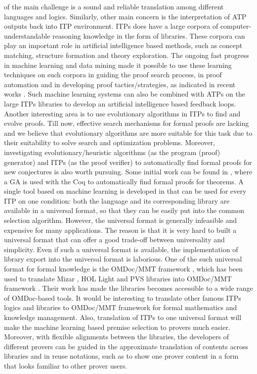 of the main challenge is a sound and reliable translation among different languages and logics.
Similarly, other main concern is the interpretation of ATP outputs back into ITP environment.
ITPs does have a large corpora of computer-understandable reasoning knowledge  in the form of libraries. 
These corpora can play an important role in artificial intelligence based methods, such as concept matching, structure formation
and theory exploration. 
The ongoing fast progress in machine learning and data mining made it possible to use
these learning techniques on such corpora in guiding the proof search process, in proof automation and in developing proof tactics/strategies, as indicated in
recent works . 
Such machine learning systems can also be combined with ATPs on the large ITPs libraries to develop an artificial intelligence based feedback loops.
Another interesting area is to use evolutionary algorithms  in ITPs to find and evolve proofs. Till now,
effective search mechanisms for formal proofs are lacking and we believe that
evolutionary algorithms are more suitable for this task due to their suitability to solve search and optimization problems.
Moreover, investigating evolutionary/heuristic algorithms (as the program (proof) generator) and ITPs (as the proof verifier) to automatically find 
formal proofs for new conjectures is also worth pursuing. Some initial work can be found in , where a GA is used with the Coq to automatically 
find formal proofs for theorems. 
A single tool based on machine learning is developed in  that can be used for every ITP on one condition: 
both the language and its corresponding library are available in a universal format, so that they can be easily put into the common selection 
algorithm. However, the universal format is generally infeasible and expensive for many applications. 
The reason is that it is very hard to built a universal format that can offer a good trade-off between universality
and simplicity. Even if such a universal format is available, the implementation of library export into the universal format is laborious. 
One of the such universal format for formal knowledge is the OMDoc/MMT framework , which has been used
to translate Mizar , HOL Light  and PVS  libraries into OMDoc/MMT framework . 
Their work has made the libraries becomes accessible to a wide range of OMDoc-based tools. 
It would be interesting to translate other famous ITPs logics and libraries to OMDoc/MMT framework for formal mathematics and knowledge management.
Also, translation of ITPs to one universal format will make the machine learning based premise selection to provers much easier.
Moreover, with flexible alignments  between the libraries, the developers of different provers can be guided in the 
approximate translation of contents across libraries and in reuse notations, such as to show one prover 
content in a form that looks familiar to other prover users.

